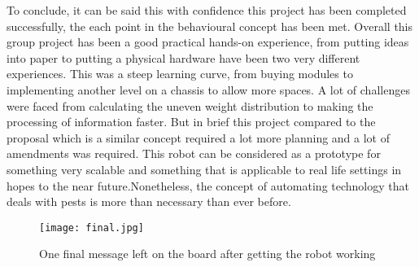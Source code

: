 \documentclass[11pt]{article}
\begin{document}
	To conclude, it can be said this with confidence this project has been completed successfully, the each point in the behavioural concept has been met. Overall this group project has been a good practical hands-on experience, from putting ideas into paper to putting a physical hardware have been two very different experiences. This was a steep learning curve, from buying modules to implementing another level on a chassis to allow more spaces. A lot of challenges were faced from calculating the  uneven weight distribution to making the processing of information faster. But in brief this project compared to the proposal which is a similar concept required a lot more planning and a lot of amendments was required. This robot can be considered as a prototype for something very scalable and something that is applicable to real life settings in hopes to the near future.Nonetheless, the concept of automating technology that deals with pests is more than necessary than ever before. 
	
	\begin{center}
	
	
	\begin{figure}[H]
		\centering
		\texttt{[image: final.jpg]}
		\caption{One final message left on the board after getting the robot working  }  
		\label{fig:Flowchart}
	\end{figure}
\end{center}
	
\end{document}
